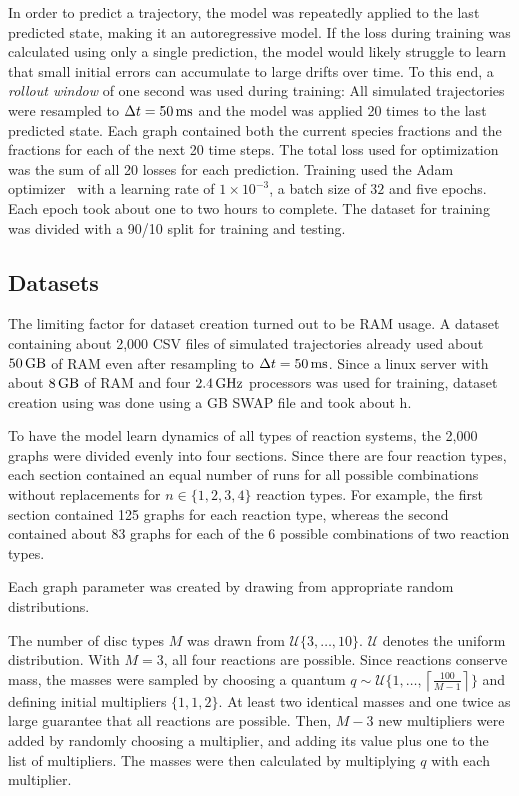 \documentclass[a4paper]{scrartcl}
\begin{document}
In order to predict a trajectory, the model was repeatedly applied to the last predicted state, making it an autoregressive model. If the loss during training was calculated using only a single prediction, the model would likely struggle to learn that small initial errors can accumulate to large drifts over time. To this end, a \textit{rollout window} of one second was used during training: All simulated trajectories were resampled to $\Delta t = \unit[50]{ms}$ and the model was applied 20 times to the last predicted state. Each graph contained both the current species fractions and the fractions for each of the next 20 time steps. The total loss used for optimization was the sum of all 20 losses for each prediction. Training used the Adam optimizer~\cite{adam} with a learning rate of $1 \times 10^{-3}$, a batch size of $32$ and five epochs. Each epoch took about one to two hours to complete. The dataset for training was divided with a 90/10 split for training and testing.

\subsection{Datasets}
The limiting factor for dataset creation turned out to be RAM usage. A dataset containing about 2,000 CSV files of simulated trajectories already used about $\unit[50]{GB}$ of RAM even after resampling to $\Delta t = \unit[50]{ms}$. Since a linux server with about $\unit[8]{GB}$ of RAM and four $\unit[2.4]{GHz}$ processors was used for training, dataset creation using  was done using a \unit[100]{GB} SWAP file and took about \unit[12]{h}.

To have the model learn dynamics of all types of reaction systems, the 2,000 graphs were divided evenly into four sections. Since there are four reaction types, each section contained an equal number of runs for all possible combinations without replacements for $n \in \{1, 2, 3, 4\}$ reaction types. For example, the first section contained 125 graphs for each reaction type, whereas the second contained about 83 graphs for each of the 6 possible combinations of two reaction types.

Each graph parameter was created by drawing from appropriate random distributions.

The number of disc types $M$ was drawn from $\mathcal{U}\{3, \hdots, 10\}$. $\mathcal{U}$ denotes the uniform distribution. With $M=3$, all four reactions are possible. Since reactions conserve mass, the masses were sampled by choosing a quantum $q \sim \mathcal{U}\{1, \hdots, \left\lceil \frac{100}{M - 1} \right\rceil\}$ and defining initial multipliers $\{1, 1, 2\}$. At least two identical masses and one twice as large guarantee that all reactions are possible. Then, $M-3$ new multipliers were added by randomly choosing a multiplier, and adding its value plus one to the list of multipliers. The masses were then calculated by multiplying $q$ with each multiplier.
\end{document}

